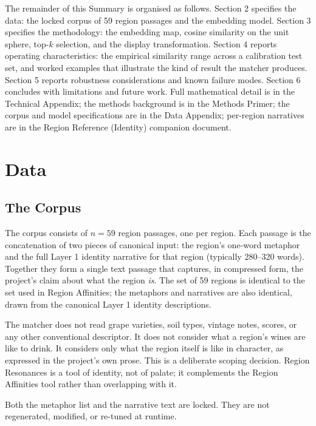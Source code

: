 \documentclass[11pt]{article}
\begin{document}
The remainder of this Summary is organised as follows. Section 2 specifies the data: the locked corpus of 59 region passages and the embedding model. Section 3 specifies the methodology: the embedding map, cosine similarity on the unit sphere, top-$k$ selection, and the display transformation. Section 4 reports operating characteristics: the empirical similarity range across a calibration test set, and worked examples that illustrate the kind of result the matcher produces. Section 5 reports robustness considerations and known failure modes. Section 6 concludes with limitations and future work. Full mathematical detail is in the Technical Appendix; the methods background is in the Methods Primer; the corpus and model specifications are in the Data Appendix; per-region narratives are in the Region Reference (Identity) companion document.

\section{Data}

\subsection{The Corpus}
The corpus consists of $n = 59$ region passages, one per region. Each passage is the concatenation of two pieces of canonical input: the region's one-word metaphor and the full Layer 1 identity narrative for that region (typically 280--320 words). Together they form a single text passage that captures, in compressed form, the project's claim about what the region \emph{is}. The set of 59 regions is identical to the set used in Region Affinities; the metaphors and narratives are also identical, drawn from the canonical Layer 1 identity descriptions.

The matcher does not read grape varieties, soil types, vintage notes, scores, or any other conventional descriptor. It does not consider what a region's wines are like to drink. It considers only what the region itself is like in character, as expressed in the project's own prose. This is a deliberate scoping decision. Region Resonances is a tool of identity, not of palate; it complements the Region Affinities tool rather than overlapping with it.

Both the metaphor list and the narrative text are locked. They are not regenerated, modified, or re-tuned at runtime.
\end{document}
